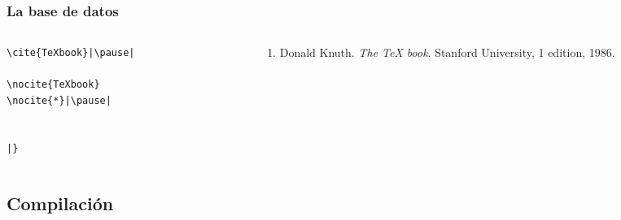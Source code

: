 \documentclass[12pt,aspectratio=169,ignorenonframetext]{ltxbeamer}
\begin{document}
\begin{frame}[fragile]
\frametitle{La base de datos}

\begin{columns}
    \begin{column}{0.5\textwidth}
        \begin{verbatim}
\cite{TeXbook}|\pause|

\nocite{TeXbook}
\nocite{*}|\pause|


|}
        \end{verbatim}
    \end{column}
    \pause
    {\color{gray} \vline}
    \begin{column}{0.5\linewidth}
        \lmr
        \begin{enumerate}
            \item Donald Knuth. \textit{The {\TeX} book}. Stanford University, 1 edition, 1986.
        \end{enumerate}
    \end{column}
\end{columns}
\end{frame}





\subsection{Compilación}
\end{document}
